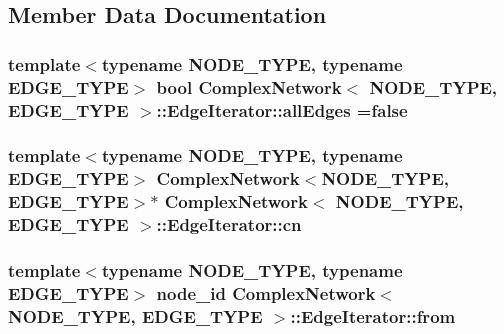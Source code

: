 \subsection{Member Data Documentation}
\hypertarget{class_complex_network_1_1_edge_iterator_a068bdce3c6e9cd86518aee5104e2fe64}{
\subsubsection[{all\+Edges}]{\setlength{\rightskip}{0pt plus 5cm}template$<$typename N\+O\+D\+E\+\_\+\+T\+Y\+P\+E, typename E\+D\+G\+E\+\_\+\+T\+Y\+P\+E$>$ bool {\bf Complex\+Network}$<$ N\+O\+D\+E\+\_\+\+T\+Y\+P\+E, E\+D\+G\+E\+\_\+\+T\+Y\+P\+E $>$\+::Edge\+Iterator\+::all\+Edges =false\hspace{0.3cm}{\ttfamily [private]}}}\label{class_complex_network_1_1_edge_iterator_a068bdce3c6e9cd86518aee5104e2fe64}
\hypertarget{class_complex_network_1_1_edge_iterator_adac38095121d411d64d387dd97eb1c67}{
\subsubsection[{cn}]{\setlength{\rightskip}{0pt plus 5cm}template$<$typename N\+O\+D\+E\+\_\+\+T\+Y\+P\+E, typename E\+D\+G\+E\+\_\+\+T\+Y\+P\+E$>$ {\bf Complex\+Network}$<$N\+O\+D\+E\+\_\+\+T\+Y\+P\+E, E\+D\+G\+E\+\_\+\+T\+Y\+P\+E$>$$\ast$ {\bf Complex\+Network}$<$ N\+O\+D\+E\+\_\+\+T\+Y\+P\+E, E\+D\+G\+E\+\_\+\+T\+Y\+P\+E $>$\+::Edge\+Iterator\+::cn\hspace{0.3cm}{\ttfamily [private]}}}\label{class_complex_network_1_1_edge_iterator_adac38095121d411d64d387dd97eb1c67}
\hypertarget{class_complex_network_1_1_edge_iterator_a380ccd02563bb5192f6b1e81409d6559}{
\subsubsection[{from}]{\setlength{\rightskip}{0pt plus 5cm}template$<$typename N\+O\+D\+E\+\_\+\+T\+Y\+P\+E, typename E\+D\+G\+E\+\_\+\+T\+Y\+P\+E$>$ {\bf node\+\_\+id} {\bf Complex\+Network}$<$ N\+O\+D\+E\+\_\+\+T\+Y\+P\+E, E\+D\+G\+E\+\_\+\+T\+Y\+P\+E $>$\+::Edge\+Iterator\+::from\hspace{0.3cm}{\ttfamily [private]}}}\label{class_complex_network_1_1_edge_iterator_a380ccd02563bb5192f6b1e81409d6559}
